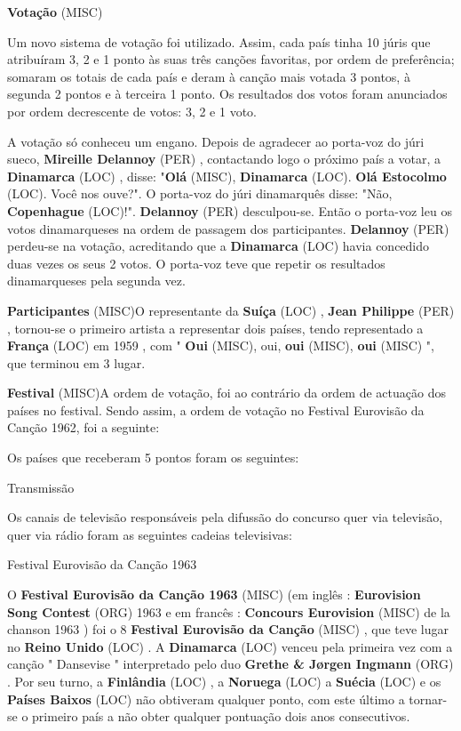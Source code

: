 \documentclass[12pt,a4paper]{article}
\begin{document}
\textbf{Votação} (MISC)

Um novo sistema de votação foi utilizado. Assim, cada país tinha 10 júris que atribuíram 3, 2 e 1 ponto às suas três canções favoritas, por ordem de preferência; somaram os totais de cada país e deram à canção mais votada 3 pontos, à segunda 2 pontos e à terceira 1 ponto. Os resultados dos votos foram anunciados por ordem decrescente de votos: 3, 2 e 1 voto.

A votação só conheceu um engano. Depois de agradecer ao porta-voz do júri sueco, \textbf{Mireille Delannoy} (PER) , contactando logo o próximo país a votar, a \textbf{Dinamarca} (LOC) , disse: "\textbf{Olá} (MISC), \textbf{Dinamarca} (LOC). \textbf{Olá Estocolmo} (LOC). Você nos ouve?". O porta-voz do júri dinamarquês disse: "Não, \textbf{Copenhague} (LOC)!". \textbf{Delannoy} (PER) desculpou-se. Então o porta-voz leu os votos dinamarqueses na ordem de passagem dos participantes. \textbf{Delannoy} (PER) perdeu-se na votação, acreditando que a \textbf{Dinamarca} (LOC) havia concedido duas vezes os seus 2 votos. O porta-voz teve que repetir os resultados dinamarqueses pela segunda vez.



\textbf{Participantes} (MISC)O representante da \textbf{Suíça} (LOC) , \textbf{Jean Philippe} (PER) , tornou-se o primeiro artista a representar dois países, tendo representado a \textbf{França} (LOC) em 1959 , com " \textbf{Oui} (MISC), oui, \textbf{oui} (MISC), \textbf{oui} (MISC) ", que terminou em 3 lugar.



\textbf{Festival} (MISC)A ordem de votação, foi ao contrário da ordem de actuação dos países no festival. Sendo assim, a ordem de votação no Festival Eurovisão da Canção 1962, foi a seguinte:

Os países que receberam 5 pontos foram os seguintes:



Transmissão

Os canais de televisão responsáveis pela difussão do concurso quer via televisão, quer via rádio foram as seguintes cadeias televisivas:



Festival Eurovisão da Canção 1963



O \textbf{Festival Eurovisão da Canção 1963} (MISC) (em inglês : \textbf{Eurovision Song Contest} (ORG) 1963 e em francês : \textbf{Concours Eurovision} (MISC) de la chanson 1963 ) foi o 8 \textbf{Festival Eurovisão da Canção} (MISC) , que teve lugar no \textbf{Reino Unido} (LOC) . A \textbf{Dinamarca} (LOC) venceu pela primeira vez com a canção " Dansevise " interpretado pelo duo \textbf{Grethe \& Jørgen Ingmann} (ORG) . Por seu turno, a \textbf{Finlândia} (LOC) , a \textbf{Noruega} (LOC) a \textbf{Suécia} (LOC) e os \textbf{Países Baixos} (LOC) não obtiveram qualquer ponto, com este último a tornar-se o primeiro país a não obter qualquer pontuação dois anos consecutivos.
\end{document}
